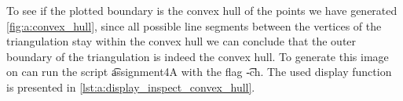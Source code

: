 



To see if the plotted boundary is the convex hull of the points we have generated \autoref{fig:a:convex_hull}, since all possible line segments between the vertices of the triangulation stay within the convex hull we can conclude that the outer boundary of the triangulation is indeed the convex hull. To generate this image on can run the script \t{assignment4A} with the flag \t{-ch}. The used display function is presented in \autoref{lst:a:display_inspect_convex_hull}.



